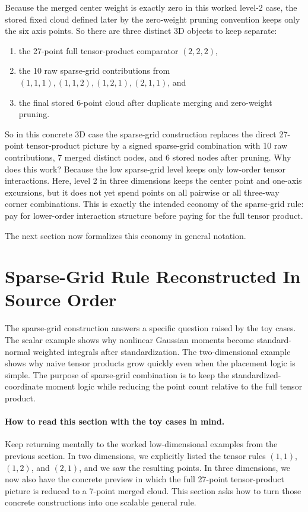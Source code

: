 \documentclass[11pt]{article}
\numberwithin{equation}{section}
\begin{document}
Because the merged center weight is exactly zero in this worked level-2 case,
the stored fixed cloud defined later by the zero-weight pruning convention keeps
only the six axis points.  So there are three distinct 3D objects to keep
separate:
\begin{enumerate}[leftmargin=0.28in]
  \item the 27-point full tensor-product comparator \((2,2,2)\),
  \item the 10 raw sparse-grid contributions from
  \((1,1,1),(1,1,2),(1,2,1),(2,1,1)\), and
  \item the final stored 6-point cloud after duplicate merging and zero-weight
  pruning.
\end{enumerate}
So in this concrete 3D case the sparse-grid construction replaces the direct
27-point tensor-product picture by a signed sparse-grid combination with 10 raw
contributions, 7 merged distinct nodes, and 6 stored nodes after pruning.  Why
does this work?
Because the low sparse-grid level keeps only low-order tensor interactions.
Here, level 2 in three dimensions keeps the center point and one-axis excursions,
but it does not yet spend points on all pairwise or all three-way corner
combinations.  This is exactly the intended economy of the sparse-grid rule: pay
for lower-order interaction structure before paying for the full tensor product.

The next section now formalizes this economy in general notation.

\section{Sparse-Grid Rule Reconstructed In Source Order}
\label{sec:p31-sgq-reconstruction}

The sparse-grid construction answers a specific question raised by the toy cases.
The scalar example shows why nonlinear Gaussian moments become standard-normal
weighted integrals after standardization.  The two-dimensional example shows why
naive tensor products grow quickly even when the placement logic is simple.  The
purpose of sparse-grid combination is to keep the standardized-coordinate moment
logic while reducing the point count relative to the full tensor product.

\paragraph{How to read this section with the toy cases in mind.}
Keep returning mentally to the worked low-dimensional examples from the previous
section.  In two dimensions, we explicitly listed the tensor rules
\((1,1)\), \((1,2)\), and \((2,1)\), and we saw the resulting points.  In three
dimensions, we now also have the concrete preview in which the full 27-point
tensor-product picture is reduced to a 7-point merged cloud.  This section asks
how to turn those concrete constructions into one scalable general rule.
\end{document}
